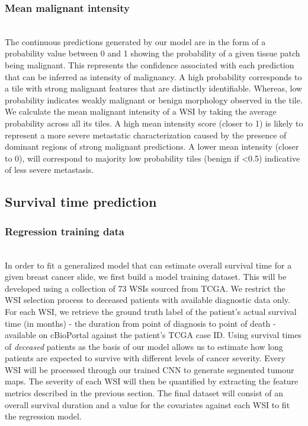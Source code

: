 \documentclass{l4proj}
\begin{document}
\subsubsection{Mean malignant intensity}
\hfill\\
The continuous predictions generated by our model are in the form of a probability value between 0 and 1 showing the probability of a given tissue patch being malignant. This represents the confidence  associated with each prediction that can be inferred as intensity of malignancy. A high probability corresponds to a tile with strong malignant features that are distinctly identifiable. Whereas, low probability indicates weakly malignant or benign morphology observed in the tile. We calculate the mean malignant intensity of a WSI by taking the average probability across all its tiles. A high mean intensity score (closer to 1) is likely to represent a more severe metastatic characterization caused by the presence of dominant regions of strong malignant predictions. A lower mean intensity (closer to 0), will correspond to majority low probability tiles (benign if <0.5) indicative of less severe metastasis. 

\subsection{Survival time prediction}
\subsubsection{Regression training data}
\hfill\\
In order to fit a generalized model that can estimate overall survival time for a given breast cancer slide, we first build a model training dataset. This will be developed using a collection of 73 WSIs sourced from TCGA. We restrict the WSI selection process to deceased patients with available diagnostic data only. For each WSI, we retrieve the ground truth label of the patient's actual survival time (in months) - the duration from point of diagnosis to point of death - available on cBioPortal against the patient's TCGA case ID. Using survival times of \textit{deceased} patients as the basis of our model allows us to estimate how long patients are expected to survive with different levels of cancer severity. Every WSI will be processed through our trained CNN to generate segmented tumour maps. The severity of each WSI will then be quantified by extracting the feature metrics described in the previous section. The final dataset will consist of an overall survival duration and a value for the covariates against each WSI to fit the regression model. \\
\end{document}
